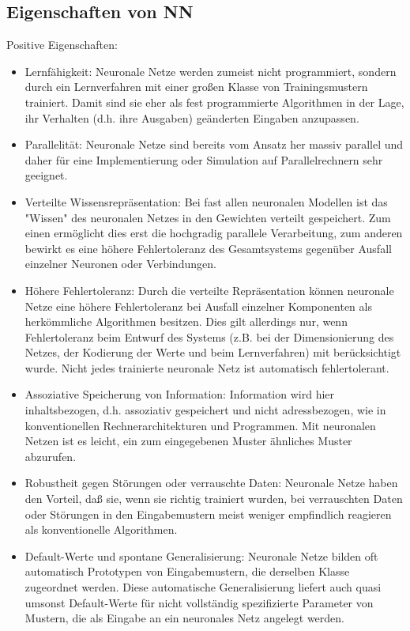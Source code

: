 \subsection{Eigenschaften von NN}
Positive Eigenschaften:
\begin{itemize}[noitemsep]
\item Lernfähigkeit: Neuronale Netze werden zumeist nicht programmiert, sondern
durch ein Lernverfahren mit einer großen Klasse von Trainingsmustern
trainiert. Damit sind sie eher als fest programmierte Algorithmen in der
Lage, ihr Verhalten (d.h. ihre Ausgaben) geänderten Eingaben anzupassen.

\item Parallelität: Neuronale Netze sind bereits vom Ansatz her massiv parallel
und daher für eine Implementierung oder Simulation auf Parallelrechnern
sehr geeignet.

\item Verteilte Wissensrepräsentation: Bei fast allen neuronalen Modellen ist das
"Wissen" des neuronalen Netzes in den Gewichten verteilt gespeichert. Zum
einen ermöglicht dies erst die hochgradig parallele Verarbeitung, zum
anderen bewirkt es eine höhere Fehlertoleranz des Gesamtsystems gegenüber
Ausfall einzelner Neuronen oder Verbindungen.

\item Höhere Fehlertoleranz: Durch die verteilte Repräsentation können neuronale
Netze eine höhere Fehlertoleranz bei Ausfall einzelner Komponenten als
herkömmliche Algorithmen besitzen. Dies gilt allerdings nur, wenn
Fehlertoleranz beim Entwurf des Systems (z.B. bei der Dimensionierung des
Netzes, der Kodierung der Werte und beim Lernverfahren) mit
berücksichtigt wurde. Nicht jedes trainierte neuronale Netz ist automatisch
fehlertolerant.

\item Assoziative Speicherung von Information: Information wird hier
inhaltsbezogen, d.h. assoziativ gespeichert und nicht adressbezogen, wie in
konventionellen Rechnerarchitekturen und Programmen. Mit neuronalen
Netzen ist es leicht, ein zum eingegebenen Muster ähnliches Muster
abzurufen.

\item Robustheit gegen Störungen oder verrauschte Daten: Neuronale Netze
haben den Vorteil, daß sie, wenn sie richtig trainiert wurden, bei
verrauschten Daten oder Störungen in den Eingabemustern meist weniger
empfindlich reagieren als konventionelle Algorithmen.

\item Default-Werte und spontane Generalisierung: Neuronale Netze bilden oft
automatisch Prototypen von Eingabemustern, die derselben Klasse
zugeordnet werden. Diese automatische Generalisierung liefert auch quasi
umsonst Default-Werte für nicht vollständig spezifizierte Parameter von
Mustern, die als Eingabe an ein neuronales Netz angelegt werden.


\end{itemize}

